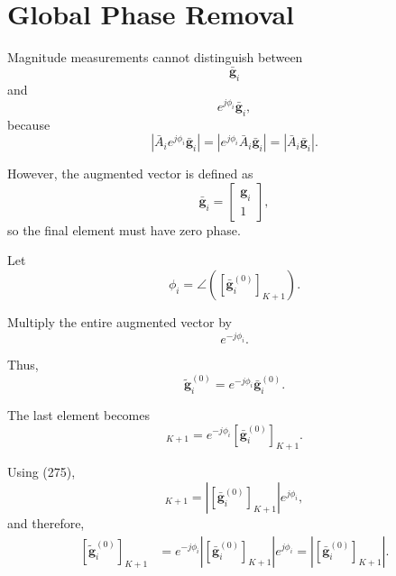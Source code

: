 \documentclass[12pt,a4paper]{article}
\begin{document}
\section{Global Phase Removal}

Magnitude measurements cannot distinguish between
\begin{equation}
\bar{\mathbf g}_i
\tag{271}
\end{equation}
and
\begin{equation}
e^{j\phi_i}\bar{\mathbf g}_i,
\tag{272}
\end{equation}
because
\begin{equation}
\left|
\bar A_ie^{j\phi_i}\bar{\mathbf g}_i
\right|
=
\left|
e^{j\phi_i}\bar A_i\bar{\mathbf g}_i
\right|
=
\left|
\bar A_i\bar{\mathbf g}_i
\right|.
\tag{273}
\end{equation}

However, the augmented vector is defined as
\begin{equation}
\bar{\mathbf g}_i
=
\begin{bmatrix}
\mathbf g_i\\
1
\end{bmatrix},
\tag{274}
\end{equation}
so the final element must have zero phase.

Let
\begin{equation}
\boxed{
\phi_i
=
\angle
\left(
[\bar{\mathbf g}_i^{(0)}]_{K+1}
\right)
}.
\tag{275}
\end{equation}

Multiply the entire augmented vector by
\begin{equation}
e^{-j\phi_i}.
\tag{276}
\end{equation}

Thus,
\begin{equation}
\boxed{
\widetilde{\mathbf g}_i^{(0)}
=
e^{-j\phi_i}\bar{\mathbf g}_i^{(0)}
}.
\tag{277}
\end{equation}

The last element becomes
\begin{equation}
[\widetilde{\mathbf g}_i^{(0)}]_{K+1}
=
e^{-j\phi_i}
[\bar{\mathbf g}_i^{(0)}]_{K+1}.
\tag{278}
\end{equation}

Using (275),
\begin{equation}
[\bar{\mathbf g}_i^{(0)}]_{K+1}
=
\left|
[\bar{\mathbf g}_i^{(0)}]_{K+1}
\right|
e^{j\phi_i},
\tag{279}
\end{equation}
and therefore,
\begin{equation}
\begin{aligned}
[\widetilde{\mathbf g}_i^{(0)}]_{K+1}
&=
e^{-j\phi_i}
\left|
[\bar{\mathbf g}_i^{(0)}]_{K+1}
\right|
e^{j\phi_i}
=
\left|
[\bar{\mathbf g}_i^{(0)}]_{K+1}
\right|.
\end{aligned}
\tag{280}
\end{equation}
\end{document}
